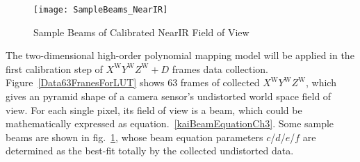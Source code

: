 %
%
\begin{figure}[t]
\centering
\texttt{[image: SampleBeams\_NearIR]}
\caption{Sample Beams of Calibrated NearIR Field of View}
\label{SampleBeams_NearIR}
\end{figure}
%
The two-dimensional high-order polynomial mapping model will be applied in the first calibration step of \(X^\text{W}Y^\text{W}Z^\text{W}+D\) frames data collection. Figure~\ref{Data63FranesForLUT} shows 63 frames of collected \(X^\text{W}Y^\text{W}Z^\text{W}\), which gives an pyramid shape of a camera sensor's undistorted world space field of view. For each single pixel, its field of view is a beam, which could be mathematically expressed as equation.~\ref{kaiBeamEquationCh3}. Some sample beams are shown in fig.~\ref{SampleBeams_NearIR}, whose beam equation parameters \(c\)/\(d\)/\(e\)/\(f\) are determined as the best-fit totally by the collected undistorted data. 

\clearpage

